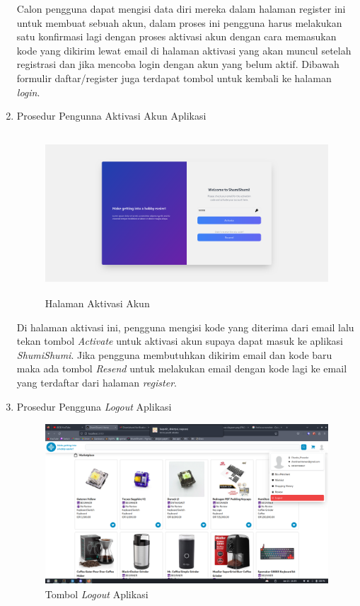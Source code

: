 \documentclass[a4paper]{article}
\begin{document}
\begin{enumerate}
Calon pengguna dapat mengisi data diri mereka dalam halaman register ini untuk membuat sebuah akun, dalam proses ini pengguna harus melakukan satu konfirmasi lagi dengan proses aktivasi akun dengan cara memasukan kode yang dikirim lewat email di halaman aktivasi yang akan muncul setelah registrasi dan jika mencoba login dengan akun yang belum aktif. Dibawah formulir daftar/register juga terdapat tombol untuk kembali ke halaman \textit{login}.

\newpage
\item Prosedur Pengunna Aktivasi Akun Aplikasi

\begin{figure}[h]
    \centering
    \includegraphics*[height=6cm]{images/prosedur pengunaan aplikasi/Activate.png}
    \caption{Halaman Aktivasi Akun}
\end{figure}

Di halaman aktivasi ini, pengguna mengisi kode yang diterima dari email lalu tekan tombol \textit{Activate} untuk aktivasi akun supaya dapat masuk ke aplikasi \textit{ShumiShumi}. Jika pengguna membutuhkan dikirim email dan kode baru maka ada tombol \textit{Resend} untuk melakukan email dengan kode lagi ke email yang terdaftar dari halaman \textit{register}.

\newpage
\item Prosedur Pengguna \textit{Logout} Aplikasi

\begin{figure}[h]
    \centering
    \includegraphics*[height=6cm]{images/prosedur pengunaan aplikasi/Logout.png}
    \caption{Tombol \textit{Logout} Aplikasi}
\end{figure}


\end{enumerate}
\end{document}
